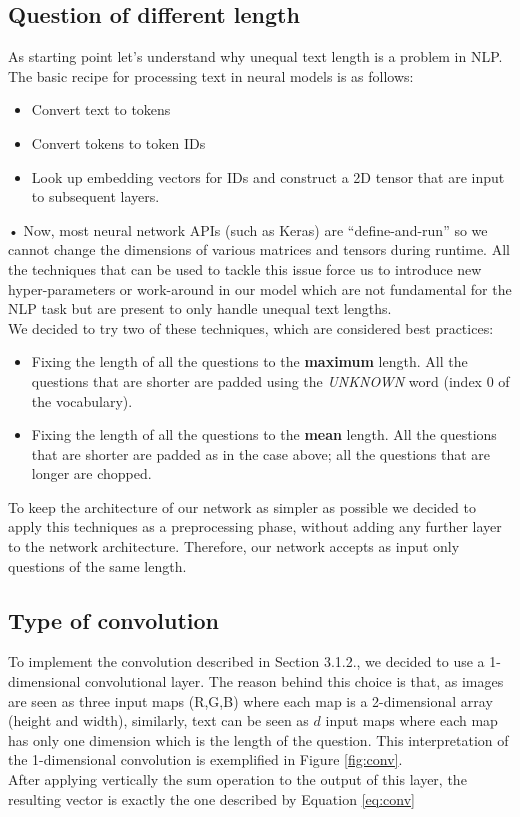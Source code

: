\documentclass[10pt,twocolumn,letterpaper]{article}
\begin{document}
\subsection{Question of different length}
As starting point let's understand why unequal text length is a problem in NLP. The basic recipe for processing text in neural models is as follows:
\begin{itemize}\itemsep0.1pt
\item Convert text to tokens
\item Convert tokens to token IDs
\item Look up embedding vectors for IDs and construct a 2D tensor that are input to subsequent layers.
\end{itemize}•
Now, most neural network APIs (such as Keras) are “define-and-run” so we cannot change the dimensions of various matrices and tensors during runtime. All the techniques that can be used to tackle this issue force us to introduce new hyper-parameters or work-around in our model which are not fundamental for  the NLP task but are present to only handle unequal text lengths.\\
We decided to try two of these techniques, which are considered best practices:
\begin{itemize}
	\item Fixing the length of all the questions to the \textbf{maximum} length. All the questions that are shorter are padded using the \emph{UNKNOWN} word (index $0$ of the vocabulary).
	\item Fixing the length of all the questions to the \textbf{mean} length. All the questions that are shorter are padded as in the case above; all the questions that are longer are chopped.
\end{itemize}
To keep the architecture of our network as simpler as possible we decided to apply this techniques as a preprocessing phase, without adding any further layer to the network architecture. Therefore, our network accepts as input only questions of the same length.\\

\subsection{Type of convolution}

To implement the convolution described in Section 3.1.2., we decided to use a 1-dimensional convolutional layer. The reason behind this choice is that, as images are seen as three input maps (R,G,B) where each map is a 2-dimensional array (height and width), similarly, text can be seen as $d$ input maps where each map has only one dimension which is the length of the question. This interpretation of the 1-dimensional convolution is exemplified in Figure \ref{fig:conv}.\\
After applying vertically the sum operation to the output of this layer, the resulting vector is exactly the one described by Equation \ref{eq:conv}    
\end{document}
